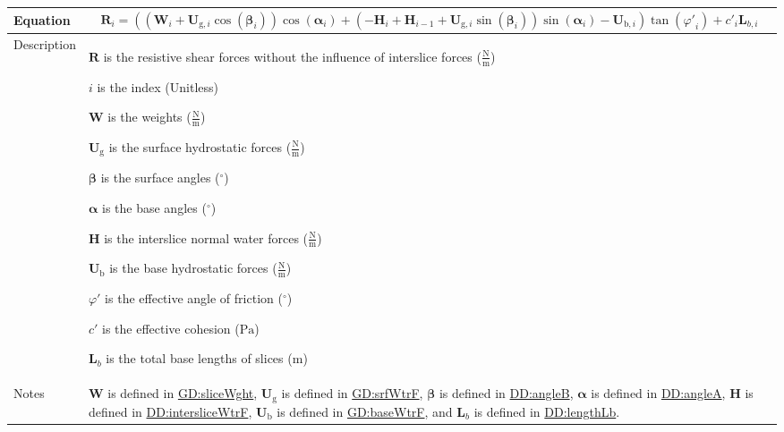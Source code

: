 \documentclass[12pt]{article}
\begin{document}
\begin{minipage}{\textwidth}
\begin{tabular}{>{\raggedright}p{}>{\raggedright\arraybackslash}p{}}
\\ \midrule
Equation & \begin{displaymath}
           {\symbf{R}}_{i}=\left(\left({\symbf{W}}_{i}+{\symbf{U}_{\text{g},i}} \cos\left({\symbf{β}}_{i}\right)\right) \cos\left({\symbf{α}}_{i}\right)+\left(-{\symbf{H}}_{i}+{\symbf{H}}_{i-1}+{\symbf{U}_{\text{g},i}} \sin\left({\symbf{β}}_{i}\right)\right) \sin\left({\symbf{α}}_{i}\right)-{\symbf{U}_{\text{b},i}}\right) \tan\left({φ'}_{i}\right)+{c'}_{i} {\symbf{L}_{b,i}}
           \end{displaymath}
\\ \midrule
Description & \begin{symbDescription}
              \item{$\symbf{R}$ is the resistive shear forces without the influence of interslice forces ($\frac{\text{N}}{\text{m}}$)}
              \item{$i$ is the index (Unitless)}
              \item{$\symbf{W}$ is the weights ($\frac{\text{N}}{\text{m}}$)}
              \item{${\symbf{U}_{\text{g}}}$ is the surface hydrostatic forces ($\frac{\text{N}}{\text{m}}$)}
              \item{$\symbf{β}$ is the surface angles (${{}^{\circ}}$)}
              \item{$\symbf{α}$ is the base angles (${{}^{\circ}}$)}
              \item{$\symbf{H}$ is the interslice normal water forces ($\frac{\text{N}}{\text{m}}$)}
              \item{${\symbf{U}_{\text{b}}}$ is the base hydrostatic forces ($\frac{\text{N}}{\text{m}}$)}
              \item{$φ'$ is the effective angle of friction (${{}^{\circ}}$)}
              \item{$c'$ is the effective cohesion (${\text{Pa}}$)}
              \item{${\symbf{L}_{b}}$ is the total base lengths of slices (${\text{m}}$)}
              \end{symbDescription}
\\ \midrule
Notes & $\symbf{W}$ is defined in \hyperref[GD:sliceWght]{GD:sliceWght}, ${\symbf{U}_{\text{g}}}$ is defined in \hyperref[GD:srfWtrF]{GD:srfWtrF}, $\symbf{β}$ is defined in \hyperref[DD:angleB]{DD:angleB}, $\symbf{α}$ is defined in \hyperref[DD:angleA]{DD:angleA}, $\symbf{H}$ is defined in \hyperref[DD:intersliceWtrF]{DD:intersliceWtrF}, ${\symbf{U}_{\text{b}}}$ is defined in \hyperref[GD:baseWtrF]{GD:baseWtrF}, and ${\symbf{L}_{b}}$ is defined in \hyperref[DD:lengthLb]{DD:lengthLb}.
        

\end{tabular}
\end{minipage}
\end{document}

